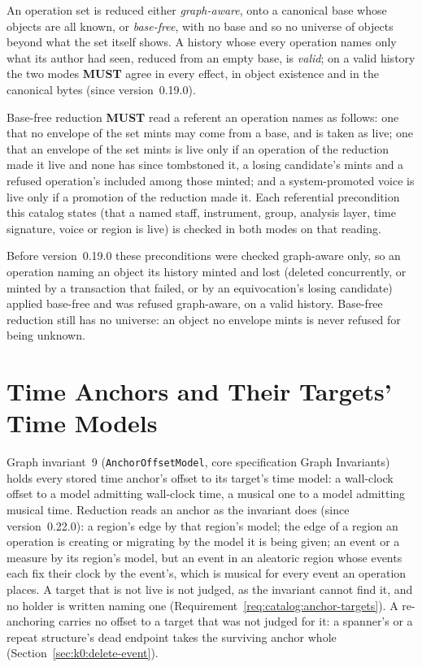 \documentclass[11pt,letterpaper]{report}
\newcommand{\sectionsc}[1]{{\addfontfeatures{Letters=SmallCaps}#1}}
\newcounter{requirement}[chapter]
\newcommand{\MUST}{\textbf{MUST}}
\begin{document}
An operation set is reduced either \emph{graph-aware}, onto a canonical base
whose objects are all known, or \emph{base-free}, with no base and so no
universe of objects beyond what the set itself shows. A history whose every
operation names only what its author had seen, reduced from an empty base, is
\emph{valid}; on a valid history the two modes \MUST{} agree in every effect,
in object existence and in the canonical bytes (since version~0.19.0).

\begin{requirement}
  \label{req:catalog:base-free-referents}
  Base-free reduction \MUST{} read a referent an operation names as follows:
  one that no envelope of the set mints may come from a base, and is taken as
  live; one that an envelope of the set mints is live only if an operation of
  the reduction made it live and none has since tombstoned it, a losing
  candidate's mints and a refused operation's included among those minted; and
  a system-promoted voice is live only if a promotion of the reduction made
  it.
  Each referential precondition this catalog states (that a named staff,
  instrument, group, analysis layer, time signature, voice or region is live)
  is checked in both modes on that reading.
\end{requirement}

\begin{rationale}
  Before version~0.19.0 these preconditions were checked graph-aware only, so
  an operation naming an object its history minted and lost (deleted
  concurrently, or minted by a transaction that failed, or by an
  equivocation's losing candidate) applied base-free and was refused
  graph-aware, on a valid history. Base-free reduction still has no universe:
  an object no envelope mints is never refused for being unknown.
\end{rationale}

\section{Time Anchors and Their Targets' Time Models}
\label{sec:framework:anchor-offsets}

Graph invariant~9 (\texttt{AnchorOffsetModel}, core specification
\sectionsc{Graph Invariants}) holds every stored time anchor's offset to its
target's time model: a wall-clock offset to a model admitting wall-clock time,
a musical one to a model admitting musical time. Reduction reads an anchor as
the invariant does (since version~0.22.0): a region's edge by that region's
model; the edge of a region an operation is creating or migrating by the model
it is being given; an event or a measure by its region's model, but an event
in an aleatoric region whose events each fix their clock by the event's, which
is musical for every event an operation places. A target that is not live is
not judged, as the invariant cannot find it, and no holder is written naming
one (Requirement~\ref{req:catalog:anchor-targets}). A re-anchoring carries no offset
to a target that was not judged for it: a spanner's or a repeat structure's
dead endpoint takes the surviving anchor whole (Section~\ref{sec:k0:delete-event}).
\end{document}
